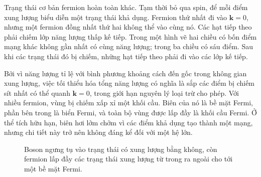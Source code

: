 Trạng thái cơ bản fermion hoàn toàn khác. Tạm thời bỏ qua spin, để mỗi điểm xung lượng biểu diễn một trạng thái khả dụng. Fermion thứ nhất đi vào \(\mathbf{k}=0\), nhưng một fermion đồng nhất thứ hai không thể vào cùng nó. Các hạt tiếp theo phải chiếm lớp năng lượng thấp kế tiếp. Trong một hình vẽ hai chiều có bốn điểm mạng khác không gần nhất có cùng năng lượng; trong ba chiều có sáu điểm. Sau khi các trạng thái đó bị chiếm, những hạt tiếp theo phải đi vào các lớp kế tiếp.

Bởi vì năng lượng tỉ lệ với bình phương khoảng cách đến gốc trong không gian xung lượng, việc tối thiểu hóa tổng năng lượng có nghĩa là sắp các điểm bị chiếm sít nhất có thể quanh \(\mathbf{k}=0\), trong giới hạn nguyên lý loại trừ cho phép. Với nhiều fermion, vùng bị chiếm xấp xỉ một khối cầu. Biên của nó là bề mặt Fermi, phần bên trong là biển Fermi, và toàn bộ vùng được lấp đầy là khối cầu Fermi. Ở thể tích hữu hạn, biên hơi lởm chởm vì các điểm khả dụng tạo thành một mạng, nhưng chi tiết này trở nên không đáng kể đối với một hệ lớn.

\begin{figure}
\centering
{}
\caption{Boson ngưng tụ vào trạng thái có xung lượng bằng không, còn fermion lấp đầy các trạng thái xung lượng từ trong ra ngoài cho tới một bề mặt Fermi.}
\end{figure}

